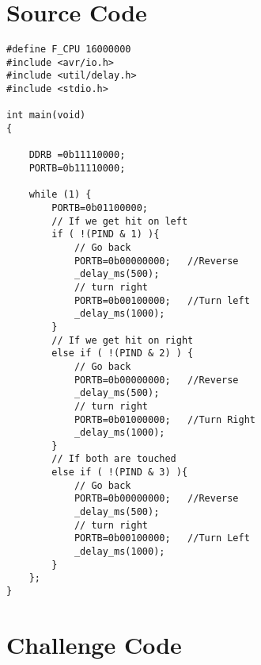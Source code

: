\documentclass[12pt,letterpaper]{article}
\begin{document}
\section{Source Code}
\begin{verbatim}
#define F_CPU 16000000
#include <avr/io.h>
#include <util/delay.h>
#include <stdio.h>

int main(void)
{

    DDRB =0b11110000;
    PORTB=0b11110000;

    while (1) {
        PORTB=0b01100000;
        // If we get hit on left
        if ( !(PIND & 1) ){
            // Go back
            PORTB=0b00000000;   //Reverse
            _delay_ms(500);
            // turn right
            PORTB=0b00100000;   //Turn left
            _delay_ms(1000);
        }
        // If we get hit on right
        else if ( !(PIND & 2) ) {
            // Go back
            PORTB=0b00000000;   //Reverse
            _delay_ms(500);
            // turn right
            PORTB=0b01000000;   //Turn Right
            _delay_ms(1000);
        }
        // If both are touched
        else if ( !(PIND & 3) ){
            // Go back
            PORTB=0b00000000;   //Reverse
            _delay_ms(500);
            // turn right
            PORTB=0b00100000;   //Turn Left
            _delay_ms(1000);
        }
    };
}
\end{verbatim}
\section{Challenge Code}
\end{document}
